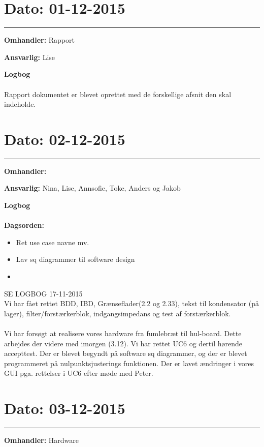 \section{Dato: 01-12-2015 }
\hrule

\textbf{Omhandler:} Rapport

\textbf{Ansvarlig:} Lise

\textbf{Logbog}
\\
\\
Rapport dokumentet er blevet oprettet med de forskellige afsnit den skal indeholde. 



\section{Dato: 02-12-2015 }
\hrule

\textbf{Omhandler:} 

\textbf{Ansvarlig:} Nina, Lise, Annsofie, Toke, Anders og Jakob

\textbf{Logbog}
\\
\\
\textbf{Dagsorden:}
\begin{itemize}
	\item Ret use case navne mv.
	\item Lav sq diagrammer til software design
	\item 
\end{itemize}

SE LOGBOG 17-11-2015 \\
Vi har fået rettet BDD, IBD, Grænseflader(2.2 og 2.33), tekst til kondensator (på lager), filter/forstærkerblok, indgangsimpedans og test af forstærkerblok.
\\
\\
Vi har forsøgt at realisere vores hardware fra fumlebræt til hul-board. Dette arbejdes der videre med imorgen (3.12).
Vi har rettet UC6 og dertil hørende accepttest. 
Der er blevet begyndt på software sq diagrammer, og der er blevet programmeret på nulpunktsjusterings funktionen. 
Der er lavet ændringer i vores GUI pga. rettelser i UC6 efter møde med Peter.
	
	
	
\section{Dato: 03-12-2015 }
\hrule

\textbf{Omhandler:} Hardware

